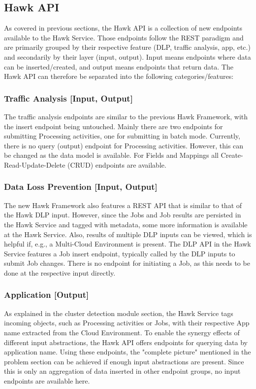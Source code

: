 \subsection{Hawk API}
As covered in previous sections, the Hawk API is a collection of new endpoints available to the Hawk Service.
Those endpoints follow the REST paradigm and are primarily grouped by their respective feature (DLP, traffic analysis, app, etc.) and secondarily by their layer (input, output). Input means endpoints where data can be inserted/created, and output means endpoints that return data. The Hawk API can therefore be separated into the following categories/features:

\subsubsection{Traffic Analysis [Input, Output]}
The traffic analysis endpoints are similar to the previous Hawk Framework, with the insert endpoint being untouched. Mainly there are two endpoints for submitting Processing activities, one for submitting in batch mode. Currently, there is no query (output) endpoint for Processing activities. However, this can be changed as the data model is available. For Fields and Mappings all Create-Read-Update-Delete (CRUD) endpoints are available.


\subsubsection{Data Loss Prevention [Input, Output]}
The new Hawk Framework also features a REST API that is similar to that of the Hawk DLP input. However, since the Jobs and Job results are persisted in the Hawk Service and tagged with metadata, some more information is available at the Hawk Service. Also, results of multiple DLP inputs can be viewed, which is helpful if, e.g., a Multi-Cloud Environment is present. The DLP API in the Hawk Service features a Job insert endpoint, typically called by the DLP inputs to submit Job changes. There is no endpoint for initiating a Job, as this needs to be done at the respective input directly.

\subsubsection{Application [Output]}
As explained in the cluster detection module section, the Hawk Service tags incoming objects, such as Processing activities or Jobs, with their respective App name extracted from the Cloud Environment. To enable the synergy effects of different input abstractions, the Hawk API offers endpoints for querying data by application name. Using these endpoints, the "complete picture" mentioned in the problem section can be achieved if enough input abstractions are present. Since this is only an aggregation of data inserted in other endpoint groups, no input endpoints are available here.

